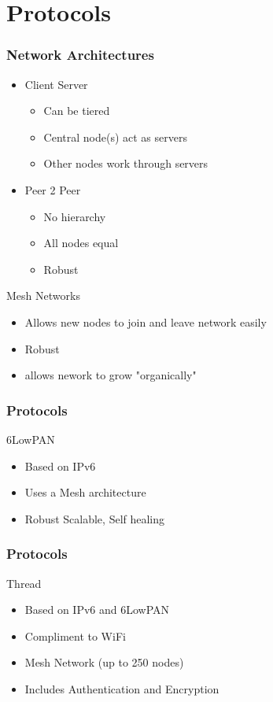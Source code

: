 \documentclass{beamer}
\begin{document}
 \section{Protocols}
   \begin{frame}
  	\frametitle{Network Architectures}
  	\begin{itemize}
  	\item  Client Server
  	  	\begin{itemize}
  			\item  Can be tiered
  			\item Central node(s) act as servers
  			\item Other nodes work through servers
  		\end{itemize}
  	\item Peer 2 Peer
  	  	\begin{itemize}
  			\item  No hierarchy
  			\item All nodes equal
  			\item Robust
  		\end{itemize} 	
  	\end{itemize}
  	 Mesh Networks
  	  	\begin{itemize}
  			\item  Allows new nodes to join and leave network easily
  			\item Robust
  			\item allows nework to grow "organically"
  		\end{itemize} 
  \end{frame}
  
  \begin{frame}
  	\frametitle{Protocols}
  	6LowPAN
  	\begin{itemize}
  	\item Based on IPv6
  	\item Uses a Mesh architecture
  	\item Robust Scalable, Self healing
  	\end{itemize}
  \end{frame}
   
  \begin{frame}
  	\frametitle{Protocols}
  	Thread
  	\begin{itemize}
  	\item Based on IPv6 and 6LowPAN
  	\item Compliment to WiFi
  	\item Mesh Network (up to 250 nodes)
  	\item Includes Authentication and Encryption
  	\end{itemize}
  \end{frame}
\end{document}
